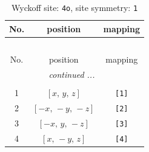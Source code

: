 \documentclass[fleqn,8pt]{jsarticle}
\begin{document}
\renewcommand{\arraystretch}{1.2}
\begin{longtable}{ccc}
\caption{Wyckoff site: {\tt 4o}, site symmetry: {\tt 1}}
 \\
 \hline \hline
No. & position & mapping \\ \hline \endfirsthead

\multicolumn{2}{l}{\tablename\ \thetable{}} \\
 \hline \hline
No. & position & mapping \\ \hline \endhead

 \hline \hline
\multicolumn{2}{r}{\footnotesize\it continued ...} \\ \endfoot

 \hline \hline
\multicolumn{2}{r}{} \\ \endlastfoot

1 & $\left[ x,\, y,\, z \right]$ & {\tt [1]} \\ \hline
2 & $\left[ - x,\, - y,\, - z \right]$ & {\tt [2]} \\ \hline
3 & $\left[ - x,\, y,\, - z \right]$ & {\tt [3]} \\ \hline
4 & $\left[ x,\, - y,\, z \right]$ & {\tt [4]} \\
\end{longtable}
\end{document}
